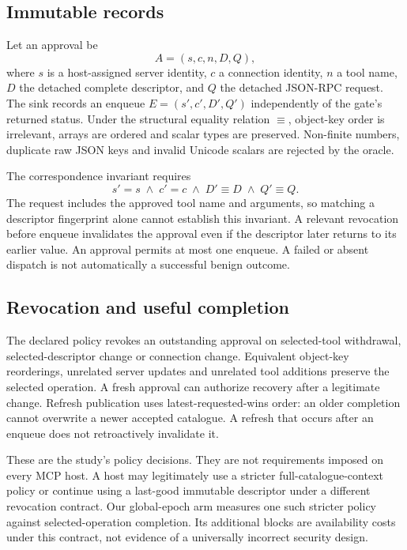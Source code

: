 \subsection{Immutable records}
Let an approval be
\begin{equation}
 A=(s,c,n,D,Q),
\end{equation}
where $s$ is a host-assigned server identity, $c$ a connection identity, $n$ a tool
name, $D$ the detached complete descriptor, and $Q$ the detached JSON-RPC request.
The sink records an enqueue $E=(s',c',D',Q')$ independently of the gate's returned
status. Under the structural equality relation $\equiv$, object-key order is
irrelevant, arrays are ordered and scalar types are preserved. Non-finite numbers,
duplicate raw JSON keys and invalid Unicode scalars are rejected by the oracle.

The correspondence invariant requires
\begin{equation}
 s'=s\;\land\;c'=c\;\land\;D'\equiv D\;\land\;Q'\equiv Q.
\end{equation}
The request includes the approved tool name and arguments, so matching a descriptor
fingerprint alone cannot establish this invariant. A relevant revocation before
enqueue invalidates the approval even if the descriptor later returns to its earlier
value. An approval permits at most one enqueue. A failed or absent dispatch is not
automatically a successful benign outcome.

\subsection{Revocation and useful completion}
The declared policy revokes an outstanding approval on selected-tool withdrawal,
selected-descriptor change or connection change. Equivalent object-key reorderings,
unrelated server updates and unrelated tool additions preserve the selected operation.
A fresh approval can authorize recovery after a legitimate change. Refresh publication
uses latest-requested-wins order: an older completion cannot overwrite a newer accepted
catalogue. A refresh that occurs after an enqueue does not retroactively invalidate it.

These are the study's policy decisions. They are not requirements imposed on every
MCP host. A host may legitimately use a stricter full-catalogue-context policy or
continue using a last-good immutable descriptor under a different revocation contract.
Our global-epoch arm measures one such stricter policy against selected-operation
completion. Its additional blocks are availability costs under this contract, not
evidence of a universally incorrect security design.

